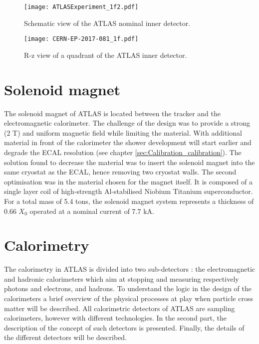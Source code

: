 \begin{figure}[htbp]
\centering
\texttt{[image: ATLASExperiment\_1f2.pdf]}
\caption{\label{fig:org92c81cc}
Schematic view of the ATLAS nominal inner detector.\cite{ATLASExperiment}}
\end{figure}

\begin{figure}[htbp]
\centering
\texttt{[image: CERN-EP-2017-081\_1f.pdf]}
\caption{\label{fig:org052773b}
R-z view of a quadrant of the ATLAS inner detector. \cite{CERN-EP-2017-081}}
\end{figure}


\section{Solenoid magnet}
\label{sec:orgc52db09}

The solenoid magnet of ATLAS is located between the tracker and the electromagnetic calorimeter.
The challenge of the design was to provide a strong (2 T) and uniform magnetic field while limiting the material.
With additional material in front of the calorimeter the shower development will start earlier and degrade the ECAL resolution (see chapter \ref{sec:Calibration_calibration}).
The solution found to decrease the material was to insert the solenoid magnet into the same cryostat as the ECAL, hence removing two cryostat walls.
The second optimisation was in the  material chosen for the magnet itself.
It is composed of a single layer coil of high-strength Al-stabilised Niobium Titanium superconductor.
For a total mass of 5.4 tons, the solenoid magnet system represents a thickness of 0.66 $X_0$ operated at a nominal current of 7.7 kA.

\section{Calorimetry}
\label{sec:orgaf4b368}
\label{sec:detector_calorimetry}

The calorimetry in ATLAS is divided into two sub-detectors : the electromagnetic and hadronic calorimeters which aim at stopping and measuring respectively photons and electrons, and hadrons.
To understand the logic in the design of the calorimeters a brief overview of the physical processes at play when particle cross matter will be described.
All calorimetric detectors of ATLAS are sampling calorimeters, however with different technologies.
In the second part, the description of the concept of such detectors is presented.
Finally, the details of the different detectors will be described.

